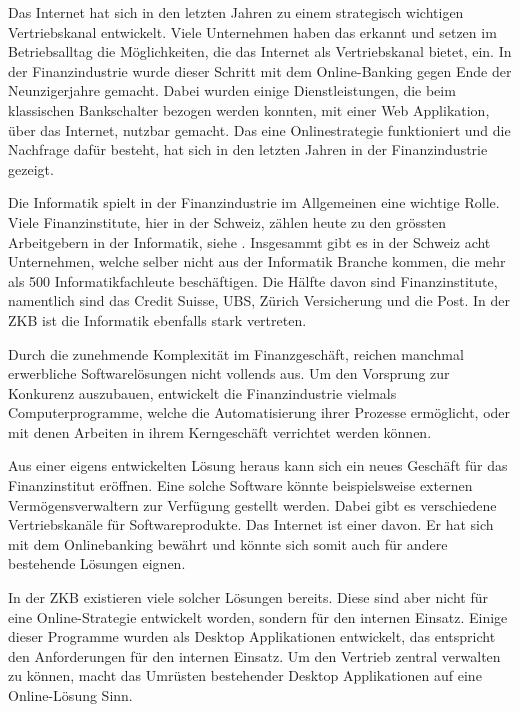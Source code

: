   Das Internet hat sich in den letzten Jahren zu einem strategisch wichtigen
  Vertriebskanal entwickelt. Viele Unternehmen haben das erkannt und setzen im
  Betriebsalltag die Möglichkeiten, die das Internet als Vertriebskanal bietet,
  ein. In der Finanzindustrie wurde dieser Schritt mit dem Online-Banking gegen
  Ende der Neunzigerjahre gemacht. Dabei wurden einige Dienstleistungen, die
  beim klassischen Bankschalter bezogen werden konnten, mit einer Web
  Applikation, über das Internet, nutzbar gemacht. Das eine Onlinestrategie
  funktioniert und die Nachfrage dafür besteht, hat sich in den letzten Jahren
  in der Finanzindustrie gezeigt.
  
  Die Informatik spielt in der Finanzindustrie im Allgemeinen eine wichtige
  Rolle. Viele Finanzinstitute, hier in der Schweiz, zählen heute zu den
  grössten Arbeitgebern in der Informatik, siehe
  \cite{WoArbeitenInformatikfachleute}. Insgesammt gibt es in der Schweiz acht
  Unternehmen, welche selber nicht aus der Informatik Branche kommen, die mehr
  als 500 Informatikfachleute beschäftigen. Die Hälfte davon sind
  Finanzinstitute, namentlich sind das Credit Suisse, UBS, Zürich Versicherung
  und die Post. In der \ac{ZKB} ist die Informatik ebenfalls stark vertreten.
  
  Durch die zunehmende Komplexität im Finanzgeschäft, reichen manchmal 
  erwerbliche Softwarelösungen nicht vollends aus. Um den Vorsprung zur
  Konkurenz auszubauen, entwickelt die Finanzindustrie vielmals
  Computerprogramme, welche die Automatisierung ihrer Prozesse ermöglicht, oder
  mit denen Arbeiten in ihrem Kerngeschäft verrichtet werden können.
  
  Aus einer eigens entwickelten Lösung heraus kann sich ein neues Geschäft für
  das Finanzinstitut eröffnen. Eine solche Software könnte beispielsweise
  externen Vermögensverwaltern zur Verfügung gestellt werden. Dabei gibt es
  verschiedene Vertriebskanäle für Softwareprodukte. Das Internet ist einer
  davon. Er hat sich mit dem Onlinebanking bewährt und könnte sich somit auch
  für andere bestehende Lösungen eignen.
  
  In der \ac{ZKB} existieren viele solcher Lösungen bereits. Diese sind
  aber nicht für eine Online-Strategie entwickelt worden, sondern für den
  internen Einsatz. Einige dieser Programme wurden als Desktop Applikationen
  entwickelt, das entspricht den Anforderungen für den internen Einsatz. Um den
  Vertrieb zentral verwalten zu können, macht das Umrüsten bestehender Desktop
  Applikationen auf eine Online-Lösung Sinn.
  

